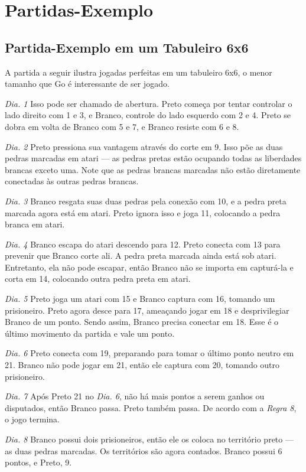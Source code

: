 \chapter{Partidas-Exemplo}

\section{Partida-Exemplo em um Tabuleiro 6x6}

A partida a seguir ilustra jogadas perfeitas em um tabuleiro 6x6, o menor tamanho que Go é interessante de ser jogado.

\emph{Dia. 1} Isso pode ser chamado de abertura. Preto começa por tentar controlar o lado direito com 1 e 3, e Branco, controle do lado esquerdo com 2 e 4. Preto se dobra em volta de Branco com 5 e 7, e Branco resiste com 6 e 8.

\emph{Dia. 2} Preto pressiona sua vantagem através do corte em 9. Isso põe as duas pedras marcadas em atari --- as pedras pretas estão ocupando todas as liberdades brancas exceto uma. Note que as pedras brancas marcadas não estão diretamente conectadas às outras pedras brancas.

\emph{Dia. 3} Branco resgata suas duas pedras pela conexão com 10, e a pedra preta marcada agora está em atari. Preto ignora isso e joga 11, colocando a pedra branca em atari.

\emph{Dia. 4} Branco escapa do atari descendo para 12. Preto conecta com 13 para prevenir que Branco corte ali. A pedra preta marcada ainda está sob atari. Entretanto, ela não pode escapar, então Branco não se importa em capturá-la e corta em 14, colocando outra pedra preta em atari.

\emph{Dia. 5} Preto joga um atari com 15 e Branco captura com 16, tomando um prisioneiro. Preto agora desce para 17, ameaçando jogar em 18 e desprivilegiar Branco de um ponto. Sendo assim, Branco precisa conectar em 18. Esse é o último movimento da partida e vale um ponto.

\emph{Dia. 6} Preto conecta com 19, preparando para tomar o último ponto neutro em 21. Branco não pode jogar em 21, então ele captura com 20, tomando outro prisioneiro.

\emph{Dia. 7} Após Preto 21 no \emph{Dia. 6}, não há mais pontos a serem ganhos ou disputados, então Branco passa. Preto também passa. De acordo com a \emph{Regra 8}, o jogo termina.

\emph{Dia. 8} Branco possui dois prisioneiros, então ele os coloca no território preto --- as duas pedras marcadas. Os territórios são agora contados. Branco possui 6 pontos, e Preto, 9.


